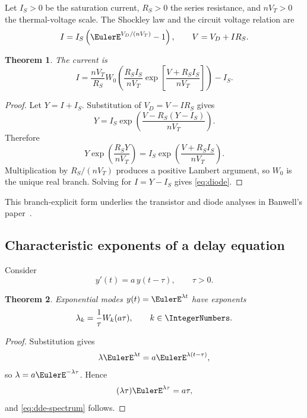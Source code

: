 \documentclass[11pt]{article}
\newtheorem{theorem}{Theorem}[section]
\theoremstyle{remark}
\begin{document}
Let \(I_S>0\) be the saturation current, \(R_S>0\) the series resistance,
and \(nV_T>0\) the thermal-voltage scale.  The Shockley law and the circuit
voltage relation are
\[
       I=I_S\left(\EulerE^{V_D/(nV_T)}-1\right),
       \qquad V=V_D+IR_S.
\]

\begin{theorem}\label{thm:diode}
The current is
\begin{equation}\label{eq:diode}
 I=
 \frac{nV_T}{R_S}
 W_0\left(
 \frac{R_SI_S}{nV_T}
 \exp\left[\frac{V+R_SI_S}{nV_T}\right]\right)-I_S.
\end{equation}
\end{theorem}

\begin{proof}
Let \(Y=I+I_S\).  Substitution of \(V_D=V-IR_S\) gives
\[
 Y=I_S\exp\left(\frac{V-R_S(Y-I_S)}{nV_T}\right).
\]
Therefore
\[
 Y\exp\left(\frac{R_SY}{nV_T}\right)
 =
 I_S\exp\left(\frac{V+R_SI_S}{nV_T}\right).
\]
Multiplication by \(R_S/(nV_T)\) produces a positive Lambert argument, so
\(W_0\) is the unique real branch.  Solving for \(I=Y-I_S\) gives
\eqref{eq:diode}.
\end{proof}

This branch-explicit form underlies the transistor and diode analyses in
Banwell's paper~\cite{banwell2000}.

\subsection{Characteristic exponents of a delay equation}

Consider
\begin{equation}\label{eq:dde}
       y'(t)=a\,y(t-\tau),\qquad \tau>0.
\end{equation}

\begin{theorem}\label{thm:dde}
Exponential modes \(y(t)=\EulerE^{\lambda t}\) have exponents
\begin{equation}\label{eq:dde-spectrum}
       \lambda_k=\frac1\tau W_k(a\tau),
       \qquad k\in\IntegerNumbers.
\end{equation}
\end{theorem}

\begin{proof}
Substitution gives
\[
       \lambda\EulerE^{\lambda t}
       =a\EulerE^{\lambda(t-\tau)},
\]
so \(\lambda=a\EulerE^{-\lambda\tau}\).  Hence
\[
       (\lambda\tau)\EulerE^{\lambda\tau}=a\tau,
\]
and \eqref{eq:dde-spectrum} follows.
\end{proof}
\end{document}
